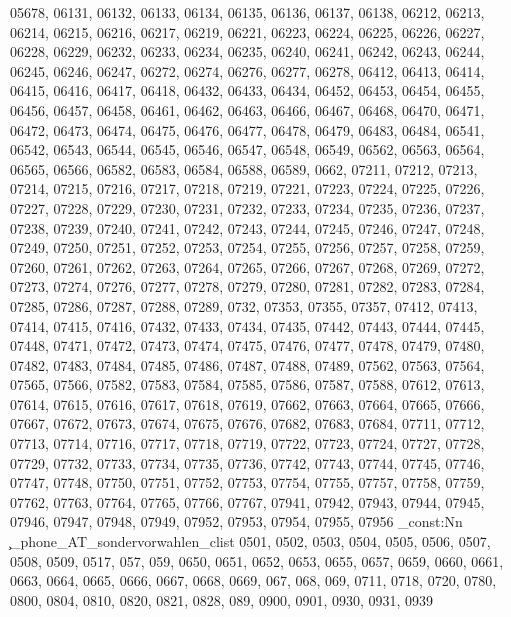 {05678,
06131,
06132,
06133,
06134,
06135,
06136,
06137,
06138,
06212,
06213,
06214,
06215,
06216,
06217,
06219,
06221,
06223,
06224,
06225,
06226,
06227,
06228,
06229,
06232,
06233,
06234,
06235,
06240,
06241,
06242,
06243,
06244,
06245,
06246,
06247,
06272,
06274,
06276,
06277,
06278,
06412,
06413,
06414,
06415,
06416,
06417,
06418,
06432,
06433,
06434,
06452,
06453,
06454,
06455,
06456,
06457,
06458,
06461,
06462,
06463,
06466,
06467,
06468,
06470,
06471,
06472,
06473,
06474,
06475,
06476,
06477,
06478,
06479,
06483,
06484,
06541,
06542,
06543,
06544,
06545,
06546,
06547,
06548,
06549,
06562,
06563,
06564,
06565,
06566,
06582,
06583,
06584,
06588,
06589,
0662,
07211,
07212,
07213,
07214,
07215,
07216,
07217,
07218,
07219,
07221,
07223,
07224,
07225,
07226,
07227,
07228,
07229,
07230,
07231,
07232,
07233,
07234,
07235,
07236,
07237,
07238,
07239,
07240,
07241,
07242,
07243,
07244,
07245,
07246,
07247,
07248,
07249,
07250,
07251,
07252,
07253,
07254,
07255,
07256,
07257,
07258,
07259,
07260,
07261,
07262,
07263,
07264,
07265,
07266,
07267,
07268,
07269,
07272,
07273,
07274,
07276,
07277,
07278,
07279,
07280,
07281,
07282,
07283,
07284,
07285,
07286,
07287,
07288,
07289,
0732,
07353,
07355,
07357,
07412,
07413,
07414,
07415,
07416,
07432,
07433,
07434,
07435,
07442,
07443,
07444,
07445,
07448,
07471,
07472,
07473,
07474,
07475,
07476,
07477,
07478,
07479,
07480,
07482,
07483,
07484,
07485,
07486,
07487,
07488,
07489,
07562,
07563,
07564,
07565,
07566,
07582,
07583,
07584,
07585,
07586,
07587,
07588,
07612,
07613,
07614,
07615,
07616,
07617,
07618,
07619,
07662,
07663,
07664,
07665,
07666,
07667,
07672,
07673,
07674,
07675,
07676,
07682,
07683,
07684,
07711,
07712,
07713,
07714,
07716,
07717,
07718,
07719,
07722,
07723,
07724,
07727,
07728,
07729,
07732,
07733,
07734,
07735,
07736,
07742,
07743,
07744,
07745,
07746,
07747,
07748,
07750,
07751,
07752,
07753,
07754,
07755,
07757,
07758,
07759,
07762,
07763,
07764,
07765,
07766,
07767,
07941,
07942,
07943,
07944,
07945,
07946,
07947,
07948,
07949,
07952,
07953,
07954,
07955,
07956}
\clist_const:Nn \c_phone_AT_sondervorwahlen_clist {0501,
0502,
0503,
0504,
0505,
0506,
0507,
0508,
0509,
0517,
057,
059,
0650,
0651,
0652,
0653,
0655,
0657,
0659,
0660,
0661,
0663,
0664,
0665,
0666,
0667,
0668,
0669,
067,
068,
069,
0711,
0718,
0720,
0780,
0800,
0804,
0810,
0820,
0821,
0828,
089,
0900,
0901,
0930,
0931,
0939}
